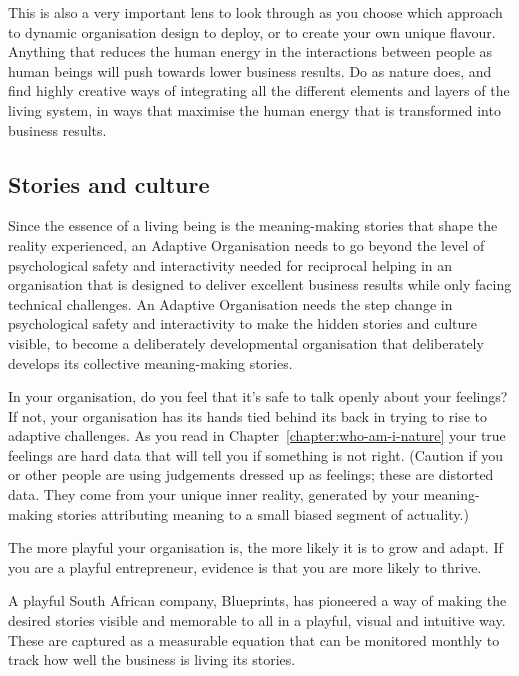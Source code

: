 This is also a very important lens to look through as you choose which approach to dynamic organisation design to deploy, or to create your own unique flavour. Anything that reduces the human energy in the interactions between people as human beings will push towards lower business results. Do as nature does, and find highly creative ways of integrating all the different elements and layers of the living system, in ways that maximise the human energy that is transformed into business results.


\subsection{Stories and culture}
Since the essence of a living being is the meaning\hyp{}making stories that shape the reality experienced, an Adaptive Organisation needs to go beyond the level of psychological safety and interactivity needed for reciprocal helping in an organisation that is designed to deliver excellent business results while only facing technical challenges. An Adaptive Organisation needs the step change in psychological safety and interactivity to make the hidden stories and culture visible, to become a deliberately developmental organisation that deliberately develops its collective meaning\hyp{}making stories.


In your organisation, do you feel that it's safe to talk openly about your feelings? If not, your organisation has its hands tied behind its back in trying to rise to adaptive challenges. As you read in Chapter~\ref{chapter:who-am-i-nature} your true feelings are hard data that will tell you if something is not right. (Caution if you or other people are using judgements dressed up as feelings; these are distorted data. They come from your unique inner reality, generated by your meaning\hyp{}making stories attributing meaning to a small biased segment of actuality.)


The more playful your organisation is, the more likely it is to grow and adapt. If you are a playful entrepreneur, evidence is that you are more likely to thrive\cite{dodgson-playful-entrepreneur}. 


A playful South African company, Blueprints,  has pioneered a way of making the desired stories visible and memorable to all in a playful, visual and intuitive way. These are captured as a measurable equation that can be monitored monthly to track how well the business is living its stories. 


